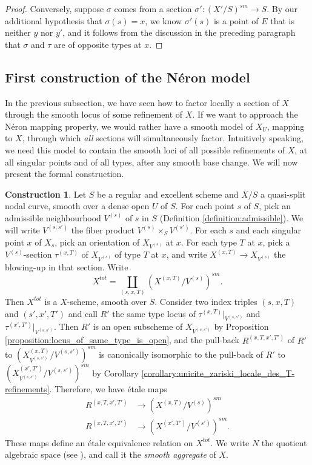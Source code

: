 \documentclass[a4paper,10pt,twoside]{article}
\theoremstyle{definition}
\newtheorem{construction}[thm]{Construction}
\theoremstyle{remark}
\begin{document}
\begin{proof}
		Conversely, suppose $\sigma$ comes from a section $\sigma'\colon (X'/S)^{sm}\to S$. By our additional hypothesis that $\sigma(s)=x$, we know $\sigma'(s)$ is a point of $E$ that is neither $y$ nor $y'$, and it follows from the discussion in the preceding paragraph that $\sigma$ and $\tau$ are of opposite types at $x$.
\end{proof}


\subsection{First construction of the N\'eron model}\label{section_nodal_agg}

In the previous subsection, we have seen how to factor locally a section of $X$ through the smooth locus of some refinement of $X$. If we want to approach the N\'eron mapping property, we would rather have a smooth model of $X_U$, mapping to $X$, through which \emph{all} sections will simultaneously factor. Intuitively speaking, we need this model to contain the smooth loci of all possible refinements of $X$, at all singular points and of all types, after any smooth base change. We will now present the formal construction.

\begin{construction}\label{construction:nodal_aggregate}
Let $S$ be a regular and excellent scheme and $X/S$ a quasi-split nodal curve, smooth over a dense open $U$ of $S$. For each point $s$ of $S$, pick an admissible neighbourhood $V^{(s)}$ of $s$ in $S$ (Definition \ref{definition:admissible}). We will write $V^{(s,s')}$ the fiber product $V^{(s)}\times_S V^{(s')}$. For each $s$ and each singular point $x$ of $X_s$, pick an orientation of $X_{V^{(s)}}$ at $x$. For each type $T$ at $x$, pick a $V^{(s)}$-section $\tau^{(x,T)}$ of $X_{V^{(s)}}$ of type $T$ at $x$, and write $X^{(x,T)}\to X_{V^{(s)}}$ the blowing-up in that section. Write
\[
X^{tot}=\coprod\limits_{(s,x,T)} (X^{(x,T)}/V^{(s)})^{sm}.
\]
Then $X^{tot}$ is a $X$-scheme, smooth over $S$. Consider two index triples $(s,x,T)$ and $(s',x',T')$ and call $R'$ the same type locus of $\tau^{(x,T)}|_{V^{(s,s')}}$ and $\tau^{(x',T')}|_{V^{(s,s')}}$. Then $R'$ is an open subscheme of $X_{V^{(s,s')}}$ by Proposition \ref{proposition:locus_of_same_type_is_open}, and the pull-back $R^{(x,T,x',T')}$ of $R'$ to $(X^{(x,T)}_{V^{(s,s')}}/V^{(s,s')})^{sm}$ is canonically isomorphic to the pull-back of $R'$ to $(X^{(x',T')}_{V^{(s,s')}}/V^{(s,s')})^{sm}$ by Corollary \ref{corollary:unicite_zariski_locale_des_T-refinements}. Therefore, we have \'etale maps
\begin{align*}
R^{(x,T,x',T')}&\to (X^{(x,T)}/V^{(s)})^{sm}\\
R^{(x,T,x',T')}&\to (X^{(x',T')}/V^{(s')})^{sm}.
\end{align*}
These maps define an \'etale equivalence relation on $X^{tot}$. We write $N$ the quotient algebraic space (see \cite[\href{https://stacks.math.columbia.edu/tag/02WW}{Tag 02WW}]{stacks-project}), and call it the \emph{smooth aggregate} of $X$.
\end{construction}
\end{document}
